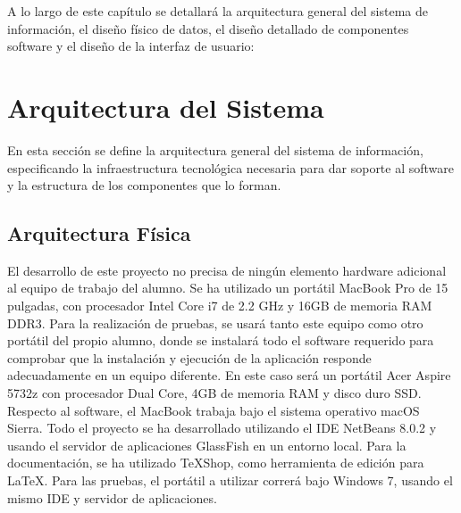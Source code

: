 

A lo largo de este capítulo se detallará la arquitectura general del sistema de información, el diseño fí­sico de datos, el diseño detallado de componentes software y el diseño de la interfaz de usuario:

\section{Arquitectura del Sistema}

En esta sección se define la arquitectura general del sistema de información, especificando la infraestructura tecnológica necesaria para dar soporte al software y la estructura de los componentes que lo forman.


\subsection{Arquitectura Fí­sica} \label{sec:arquitectura-fisica}

El desarrollo de este proyecto no precisa de ningún elemento hardware adicional al equipo de trabajo del alumno. Se ha utilizado un portátil MacBook Pro de 15 pulgadas, con procesador Intel Core i7 de 2.2 GHz y 16GB de memoria RAM DDR3. Para la realización de pruebas, se usará tanto este equipo como otro portátil del propio alumno, donde se instalará todo el software requerido para comprobar que la instalación y ejecución de la aplicación responde adecuadamente en un equipo diferente. En este caso será un portátil Acer Aspire 5732z con procesador Dual Core, 4GB de memoria RAM y disco duro SSD. \\

Respecto al software, el MacBook trabaja bajo el sistema operativo macOS Sierra. Todo el proyecto se ha desarrollado utilizando el IDE NetBeans 8.0.2 y usando el servidor de aplicaciones GlassFish en un entorno local. Para la documentación, se ha utilizado TeXShop, como herramienta de edición para \LaTeX. Para las pruebas, el portátil a utilizar correrá bajo Windows 7, usando el mismo IDE y servidor de aplicaciones. \\

